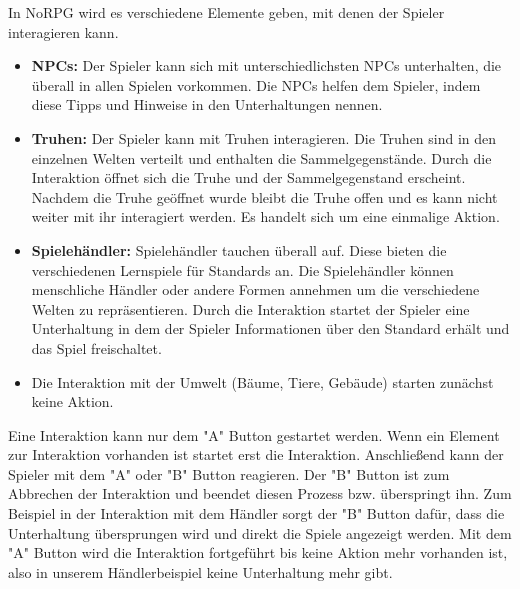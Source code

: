 			In NoRPG wird es verschiedene Elemente geben, mit denen der Spieler interagieren kann.
			
			\begin{itemize}
				\item {\textbf{\acp{NPC}:} Der Spieler kann sich mit unterschiedlichsten \acp{NPC} unterhalten, die überall in allen Spielen vorkommen. Die \acp{NPC} helfen dem Spieler, indem diese Tipps und Hinweise in den Unterhaltungen nennen.}
				\item {\textbf{Truhen:} Der Spieler kann mit Truhen interagieren. Die Truhen sind in den einzelnen Welten verteilt und enthalten die Sammelgegenstände. Durch die Interaktion öffnet sich die Truhe und der Sammelgegenstand erscheint. Nachdem die Truhe geöffnet wurde bleibt die Truhe offen und es kann nicht weiter mit ihr interagiert werden. Es handelt sich um eine einmalige Aktion.}
				\item {\textbf{Spielehändler:} Spielehändler tauchen überall auf. Diese bieten die verschiedenen Lernspiele für Standards an. Die Spielehändler können menschliche Händler oder andere Formen annehmen um die verschiedene Welten zu repräsentieren. Durch die Interaktion startet der Spieler eine Unterhaltung in dem der Spieler Informationen über den Standard erhält und das Spiel freischaltet.}
				\item {Die Interaktion mit der Umwelt (Bäume, Tiere, Gebäude) starten zunächst keine Aktion.}
			\end{itemize}
			
			Eine Interaktion kann nur dem "A" Button gestartet werden. Wenn ein Element zur Interaktion vorhanden ist startet erst die Interaktion. Anschließend kann der Spieler mit dem "A" oder "B" Button reagieren. Der "B" Button ist zum Abbrechen der Interaktion und beendet diesen Prozess bzw. überspringt ihn. Zum Beispiel in der Interaktion mit dem Händler sorgt der "B" Button dafür, dass die Unterhaltung übersprungen wird und direkt die Spiele angezeigt werden. Mit dem "A" Button wird die Interaktion fortgeführt bis keine Aktion mehr vorhanden ist, also in unserem Händlerbeispiel keine Unterhaltung mehr gibt.
			
